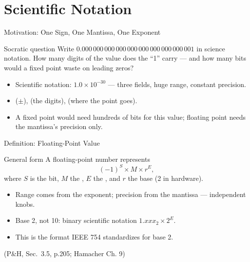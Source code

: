 \documentclass[aspectratio=169]{beamer}
\begin{document}

\section{Scientific Notation}

\begin{frame}{Motivation: One Sign, One Mantissa, One Exponent}
  \begin{block}{Socratic question}
    Write $0.000\,000\,000\,000\,000\,000\,000\,000\,000\,001$ in science
    notation. How many digits of the value does the ``1'' carry --- and how
    many bits would a fixed point waste on leading zeros?
  \end{block}
  \begin{itemize}
    \item Scientific notation: $1.0 \times 10^{-30}$ --- three fields, huge
      range, constant precision.
    \item {} ($\pm$),  (the digits),
       (where the point goes).
    \item A fixed point would need hundreds of bits for this value; floating
      point needs the mantissa's precision only.
  \end{itemize}
\end{frame}

\begin{frame}{Definition: Floating-Point Value}
  \begin{block}{General form}
    A floating-point number represents
    \[
      (-1)^S \times M \times r^E,
    \]
    where $S$ is the  bit, $M$ the , $E$ the
    , and $r$ the base (2 in hardware).
  \end{block}
  \begin{itemize}
    \item Range comes from the exponent; precision from the mantissa ---
      independent knobs.
    \item Base 2, not 10: binary scientific notation
      $1.xxx_2 \times 2^E$.
    \item This is the format IEEE 754 standardizes for base 2.
  \end{itemize}
  (P\&H, Sec.~3.5, p.205; Hamacher Ch. 9) \cite{PattersonHennessy2017_computer_organization_design,Hamacher2002_computer_organization}
\end{frame}
\end{document}
